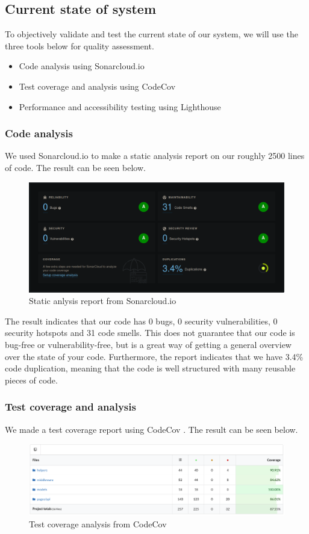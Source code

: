 \documentclass{article}
\begin{document}
\subsection{Current state of system}
To objectively validate and test the current state of our system, we will use the three tools below for quality assessment.
\begin{itemize}
    \item Code analysis using Sonarcloud.io
    \item Test coverage and analysis using CodeCov
    \item Performance and accessibility testing using Lighthouse
\end{itemize}

\subsubsection{Code analysis}
We used Sonarcloud.io to make a static analysis report on our roughly 2500 lines of code. The result can be seen below.
\begin{figure}[H]
    \centering
    \includegraphics[scale=0.30]{images/sonarcloud.png}
    \caption{Static anlysis report from Sonarcloud.io}
\end{figure}

The result indicates that our code has 0 bugs, 0 security vulnerabilities, 0 security hotspots and 31 code smells. This does not guarantee that our code is bug-free or vulnerability-free, but is a great way of getting a general overview over the state of your code.
Furthermore, the report indicates that we have 3.4\% code duplication, meaning that the code is well structured with many reusable pieces of code. 

\subsubsection{Test coverage and analysis}
We made a test coverage report using CodeCov \cite{codecov}. The result can be seen below.
\begin{figure}[H]
    \centering
    \includegraphics[scale=0.30]{images/codecov.png}
    \caption{Test coverage analysis from CodeCov}
\end{figure}
\end{document}
